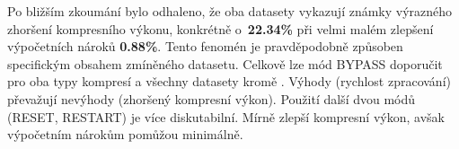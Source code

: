 \noindent Po bližším zkoumání bylo odhaleno, že oba datasety  vykazují známky výrazného zhoršení kompresního výkonu, konkrétně o~\textbf{22.34\%} při velmi malém zlepšení výpočetních nároků \textbf{0.88\%}. Tento fenomén je pravděpodobně způsoben specifickým obsahem zmíněného datasetu. Celkově lze mód BYPASS doporučit pro oba typy kompresí a všechny datasety kromě . Výhody (rychlost zpracování) převažují nevýhody (zhoršený kompresní výkon). Použití další dvou módů (RESET, RESTART) je více diskutabilní. Mírně zlepší kompresní výkon, avšak výpočetním nárokům pomůžou minimálně. 
%
%
\newpage
